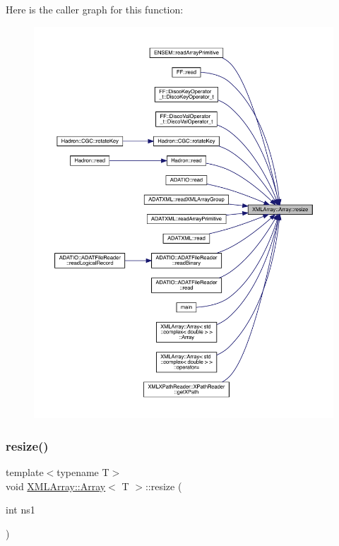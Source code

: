 Here is the caller graph for this function\+:
\nopagebreak
\begin{figure}[H]
\begin{center}
\leavevmode
\includegraphics[width=350pt]{db/d6c/classXMLArray_1_1Array_a470913fde270ad0e578041654e2390f0_icgraph}
\end{center}
\end{figure}
\mbox{\label{classXMLArray_1_1Array_a470913fde270ad0e578041654e2390f0}} 
\subsubsection{\texorpdfstring{resize()}{resize()}\hspace{0.1cm}{\footnotesize\ttfamily [2/3]}}
{\footnotesize\ttfamily template$<$typename T$>$ \\
void \mbox{\hyperlink{classXMLArray_1_1Array}{X\+M\+L\+Array\+::\+Array}}$<$ T $>$\+::resize (\begin{DoxyParamCaption}\item[{int}]{ns1 }\end{DoxyParamCaption})\hspace{0.3cm}{\ttfamily [inline]}}



